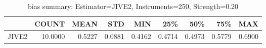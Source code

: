 \begin{table}[ht]
\centering
\caption{bias summary: Estimator=JIVE2, Instruments=250, Strength=0.20}
\begin{tabular}{lrrrrrrrr}
\toprule
 & COUNT & MEAN & STD & MIN & 25\% & 50\% & 75\% & MAX \\
\midrule
JIVE2 & 10.0000 & 0.5227 & 0.0881 & 0.4162 & 0.4714 & 0.4973 & 0.5779 & 0.6900 \\
\bottomrule
\end{tabular}
\end{table}
